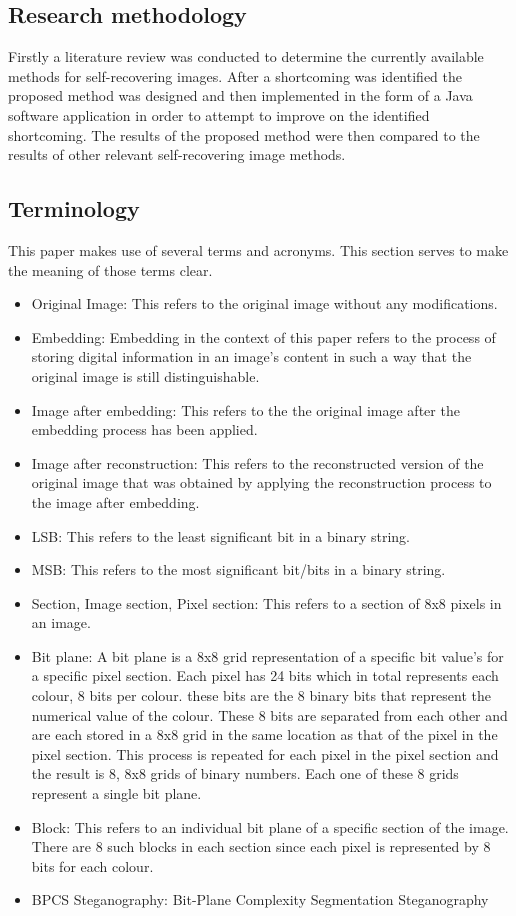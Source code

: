 \documentclass[12pt]{article}
\begin{document}
\subsection{Research methodology}
Firstly a literature review was conducted to determine the currently available methods for self-recovering images. 
After a shortcoming was identified the proposed method was designed and then implemented in the form of a Java software application in order to attempt to improve on the identified shortcoming. 
The results of the proposed method were then compared to the results of other relevant self-recovering image methods.

\subsection{Terminology}
This paper makes use of several terms and acronyms.
This section serves to make the meaning of those terms clear.

\begin{itemize}
  \item Original Image: This refers to the original image without any modifications.
  \item Embedding: Embedding in the context of this paper refers to the process of storing digital information in an image's content in such a way that the original image is still distinguishable.
  \item Image after embedding: This refers to the the original image after the embedding process has been applied.
  \item Image after reconstruction: This refers to the reconstructed version of the original image that was obtained by applying the reconstruction process to the image after embedding.
  \item LSB: This refers to the least significant bit in a binary string.
  \item MSB: This refers to the most significant bit/bits in a binary string.
  \item Section, Image section, Pixel section: This refers to a section of 8x8 pixels in an image.
  \item Bit plane: A bit plane is a 8x8 grid representation of a specific bit value's for a specific pixel section. Each pixel has 24 bits which in total represents each colour, 8 bits per colour. these bits are the 8 binary bits that represent the numerical value of the colour. These 8 bits are separated from each other and are each stored in a 8x8 grid in the same location as that of the pixel in the pixel section. This process is repeated for each pixel in the pixel section and the result is 8, 8x8 grids of binary numbers. Each one of these 8 grids represent a single bit plane. 
  \item Block: This refers to an individual bit plane of a specific section of the image. There are 8 such blocks in each section since each pixel is represented by 8 bits for each colour.
  \item BPCS Steganography: Bit-Plane Complexity Segmentation Steganography
\end{itemize}
\end{document}
